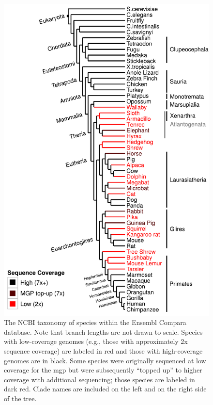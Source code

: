 \begin{figure}
\centering
\includegraphics[scale=0.7]{Figs/species_tree.pdf}
\caption{The NCBI taxonomy of species within the Ensembl Compara
  database. Note that branch lengths are not drawn to scale. Species
  with low-coverage genomes (e.g., those with approximately 2x
  sequence coverage) are labeled in red and those with high-coverage
  genomes are in black. Some species were originally sequenced at low
  coverage for the \ac{mgp} but were subsequently ``topped up'' to
  higher coverage with additional sequencing; those species are
  labeled in dark red. Clade names are included on the left and on the
  right side of the tree.}
\label{fig_ncbi_tree}
\end{figure}

